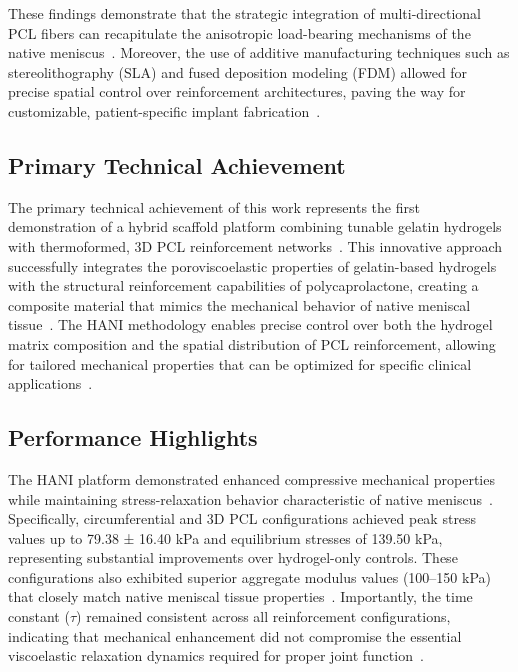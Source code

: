 These findings demonstrate that the strategic integration of multi-directional PCL fibers can recapitulate the anisotropic load-bearing mechanisms of the native meniscus~\cite{elkommos2025hybridhydrogels}. Moreover, the use of additive manufacturing techniques such as stereolithography (SLA) and fused deposition modeling (FDM) allowed for precise spatial control over reinforcement architectures, paving the way for customizable, patient-specific implant fabrication~\cite{filardo2019patientspecificmeniscus}.

\subsection{Primary Technical Achievement}

The primary technical achievement of this work represents the first demonstration of a hybrid scaffold platform combining tunable gelatin hydrogels with thermoformed, 3D PCL reinforcement networks~\cite{elkommos2025hybridhydrogels}. This innovative approach successfully integrates the poroviscoelastic properties of gelatin-based hydrogels with the structural reinforcement capabilities of polycaprolactone, creating a composite material that mimics the mechanical behavior of native meniscal tissue~\cite{bulle2021humanmeniscus, abdelgaied2015comparisonbiomechanical}. The HANI methodology enables precise control over both the hydrogel matrix composition and the spatial distribution of PCL reinforcement, allowing for tailored mechanical properties that can be optimized for specific clinical applications~\cite{gupta2020meniscaltissue}.

\subsection{Performance Highlights}

The HANI platform demonstrated enhanced compressive mechanical properties while maintaining stress-relaxation behavior characteristic of native meniscus~\cite{bulle2021humanmeniscus}. Specifically, circumferential and 3D PCL configurations achieved peak stress values up to 79.38 ± 16.40 kPa and equilibrium stresses of 139.50 kPa, representing substantial improvements over hydrogel-only controls. These configurations also exhibited superior aggregate modulus values (100--150 kPa) that closely match native meniscal tissue properties~\cite{abdelgaied2015comparisonbiomechanical}. Importantly, the time constant ($\tau$) remained consistent across all reinforcement configurations, indicating that mechanical enhancement did not compromise the essential viscoelastic relaxation dynamics required for proper joint function~\cite{makris2011kneemeniscus}.

